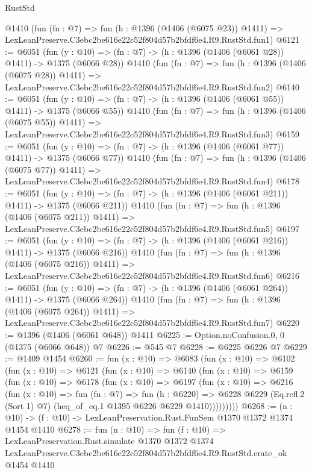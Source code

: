 \begin{lexlean}{RustStd}
\begin{coremodule}
    @1410
    (fun (fn : @7) =>
    fun (h : @1396 (@1406 (@6075 @23)) @1411) =>
    LexLeanPreserve.C3ebc2be616e22c52f804d57b2bfdf6e4.R9.RustStd.fun1)
@6121 := @6051
    (fun (y : @10) => (fn : @7) -> (h : @1396 (@1406 (@6061 @28)) @1411) -> @1375 (@6066 @28))
    @1410
    (fun (fn : @7) =>
    fun (h : @1396 (@1406 (@6075 @28)) @1411) =>
    LexLeanPreserve.C3ebc2be616e22c52f804d57b2bfdf6e4.R9.RustStd.fun2)
@6140 := @6051
    (fun (y : @10) => (fn : @7) -> (h : @1396 (@1406 (@6061 @55)) @1411) -> @1375 (@6066 @55))
    @1410
    (fun (fn : @7) =>
    fun (h : @1396 (@1406 (@6075 @55)) @1411) =>
    LexLeanPreserve.C3ebc2be616e22c52f804d57b2bfdf6e4.R9.RustStd.fun3)
@6159 := @6051
    (fun (y : @10) => (fn : @7) -> (h : @1396 (@1406 (@6061 @77)) @1411) -> @1375 (@6066 @77))
    @1410
    (fun (fn : @7) =>
    fun (h : @1396 (@1406 (@6075 @77)) @1411) =>
    LexLeanPreserve.C3ebc2be616e22c52f804d57b2bfdf6e4.R9.RustStd.fun4)
@6178 := @6051
    (fun (y : @10) => (fn : @7) -> (h : @1396 (@1406 (@6061 @211)) @1411) -> @1375 (@6066 @211))
    @1410
    (fun (fn : @7) =>
    fun (h : @1396 (@1406 (@6075 @211)) @1411) =>
    LexLeanPreserve.C3ebc2be616e22c52f804d57b2bfdf6e4.R9.RustStd.fun5)
@6197 := @6051
    (fun (y : @10) => (fn : @7) -> (h : @1396 (@1406 (@6061 @216)) @1411) -> @1375 (@6066 @216))
    @1410
    (fun (fn : @7) =>
    fun (h : @1396 (@1406 (@6075 @216)) @1411) =>
    LexLeanPreserve.C3ebc2be616e22c52f804d57b2bfdf6e4.R9.RustStd.fun6)
@6216 := @6051
    (fun (y : @10) => (fn : @7) -> (h : @1396 (@1406 (@6061 @264)) @1411) -> @1375 (@6066 @264))
    @1410
    (fun (fn : @7) =>
    fun (h : @1396 (@1406 (@6075 @264)) @1411) =>
    LexLeanPreserve.C3ebc2be616e22c52f804d57b2bfdf6e4.R9.RustStd.fun7)
@6220 := @1396 (@1406 (@6061 @648)) @1411
@6225 := Option.noConfusion.{0, 0} (@1375 (@6066 @648)) @7
@6226 := @545 @7
@6228 := @6225 @6226 @7
@6229 := @1409 @1454
@6260 := fun (x : @10) =>
  @6083
    (fun (x : @10) =>
    @6102
      (fun (x : @10) =>
      @6121
        (fun (x : @10) =>
        @6140
          (fun (x : @10) =>
          @6159
            (fun (x : @10) =>
            @6178
              (fun (x : @10) =>
              @6197
                (fun (x : @10) =>
                @6216
                  (fun (x : @10) =>
                  fun (fn : @7) =>
                  fun (h : @6220) =>
                  @6228
                    @6229
                    (Eq.refl.{2} (Sort 1) @7)
                    (heq_of_eq.{1} @1395 @6226 @6229 @1410)))))))))
@6268 := (n : @10) -> (f : @10) -> LexLeanPreservation.Rust.FunSem @1370 @1372 @1374 @1454 @1410
@6278 := fun (n : @10) =>
  fun (f : @10) =>
  LexLeanPreservation.Rust.simulate
    @1370
    @1372
    @1374
    LexLeanPreserve.C3ebc2be616e22c52f804d57b2bfdf6e4.R9.RustStd.crate_ok
    @1454
    @1410
\end{coremodule}
\end{lexlean}
